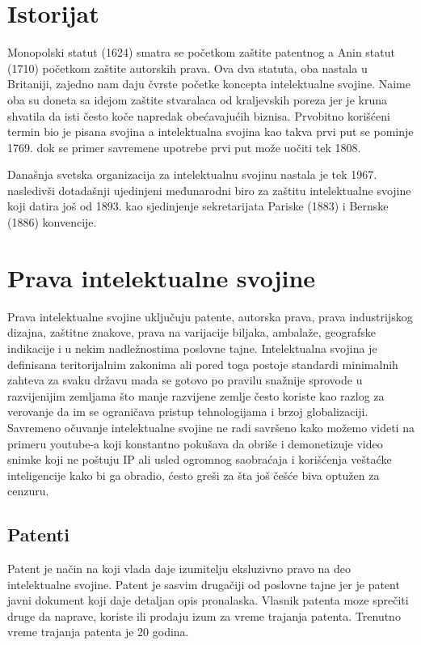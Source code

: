 \documentclass[a4paper]{article}
\begin{document}
\section{Istorijat}
Monopolski statut (1624) smatra se početkom zaštite patentnog a Anin statut (1710) početkom zaštite autorskih prava. Ova dva statuta, oba nastala u Britaniji, zajedno nam daju čvrste početke koncepta intelektualne svojine. Naime oba su doneta sa idejom zaštite stvaralaca od kraljevskih poreza jer je kruna shvatila da isti često koče napredak obećavajućih biznisa. Prvobitno korišćeni termin bio je pisana svojina a intelektualna svojina kao takva prvi put se pominje 1769. dok se primer savremene upotrebe prvi put može uočiti tek 1808. 

Današnja svetska organizacija za intelektualnu svojinu nastala je tek 1967. nasledivši dotadašnji ujedinjeni međunarodni biro za zaštitu intelektualne svojine koji datira još od 1893. kao sjedinjenje sekretarijata Pariske (1883) i Bernske (1886) konvencije.

\section{Prava intelektualne svojine}	
\label{sec:prava_int_svoj}

Prava intelektualne svojine uključuju patente, autorska prava, prava industrijskog dizajna, zaštitne znakove, prava na varijacije biljaka, ambalaže, geografske indikacije i u nekim nadležnostima poslovne tajne. Intelektualna svojina je definisana
teritorijalnim zakonima ali pored toga postoje standardi minimalnih zahteva za
svaku državu mada se gotovo po pravilu snažnije sprovode u razvijenijim
zemljama što manje razvijene zemlje često koriste kao razlog za verovanje da im
se ograničava pristup tehnologijama i brzoj globalizaciji. Savremeno očuvanje
intelektualne svojine ne radi savršeno kako možemo videti na primeru youtube-a
koji konstantno pokušava da obriše i demonetizuje video snimke koji ne poštuju
IP ali usled ogromnog saobraćaja i korišćenja veštaćke inteligencije kako bi ga obradio, ćesto greši za šta još češće biva optužen za cenzuru.

\subsection{Patenti}
\label{subsec:patenti}

Patent je način na koji vlada daje izumitelju eksluzivno pravo na deo intelektualne svojine. Patent je sasvim drugačiji od poslovne tajne jer je patent javni dokument koji daje detaljan opis pronalaska. Vlasnik patenta moze sprečiti druge da naprave, koriste ili prodaju izum za vreme trajanja patenta. Trenutno vreme trajanja patenta je 20 godina.
\end{document}
